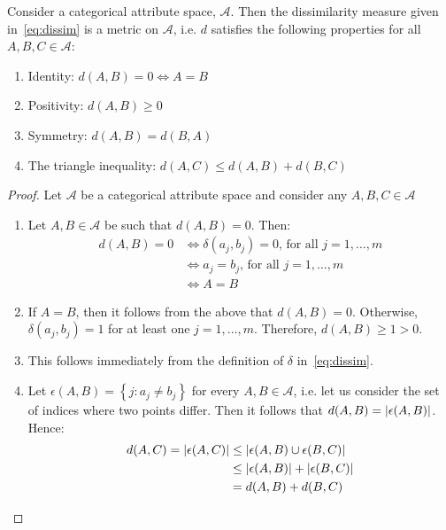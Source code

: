 \begin{theorem}\label{thm:distance}
    Consider a categorical attribute space, \(\mathcal A\). Then the
    dissimilarity measure given in~\eqref{eq:dissim} is a metric on \(\mathcal
    A\), i.e. \(d\) satisfies the following properties for all \(A, B, C \in
    \mathcal A\):

    \begin{enumerate}
        \item Identity: \(d(A, B) = 0 \iff A = B\)
        \item Positivity: \(d(A, B) \geq 0\)
        \item Symmetry: \(d(A, B) = d(B, A)\)
        \item The triangle inequality: \(d(A, C) \leq d(A, B) + d(B, C)\)
    \end{enumerate}

    \begin{proof}
        Let \(\mathcal A\) be a categorical attribute space and consider any 
        \(A, B, C \in \mathcal A\)
        
        \begin{enumerate}
            \item Let \(A, B \in \mathcal A\) be such that \(d(A, B) = 0\).
                Then:
                \[
                    \begin{aligned}
                        d(A, B) = 0
                        & \iff \delta\left(a_j, b_j\right) = 0 \text{, for all }
                            j=1,\ldots,m\\
                        & \iff a_j = b_j \text{, for all } j=1,\ldots,m\\
                        & \iff A = B
                    \end{aligned}
                \]
            \item If \(A = B\), then it follows from the above that
                \(d(A, B) = 0\). Otherwise, \(\delta\left(a_j, b_j\right) = 1\)
                for at least one \(j = 1, \ldots, m\). Therefore,
                \(d(A, B) \geq 1 > 0\).
            \item This follows immediately from the definition of \(\delta\)
                in~\eqref{eq:dissim}.
            \item Let \(\epsilon(A, B) = \left\{j : a_j \neq b_j\right\}\) for
                every \(A, B \in \mathcal A\), i.e. let us consider the set of
                indices where two points differ. Then it follows that
                \(d(A, B) = \abs*{\epsilon (A, B)}\). Hence:
                \[
                    \begin{aligned}
                        d(A, C) = \abs*{\epsilon(A, C)}
                        & \leq \abs*{\epsilon(A, B) \cup \epsilon(B, C)}\\
                        & \leq \abs*{\epsilon(A, B)} + \abs*{\epsilon(B, C)}\\
                        & = d(A, B) + d(B, C)
                    \end{aligned}
                \]
        \end{enumerate}


\end{proof}
\end{theorem}
